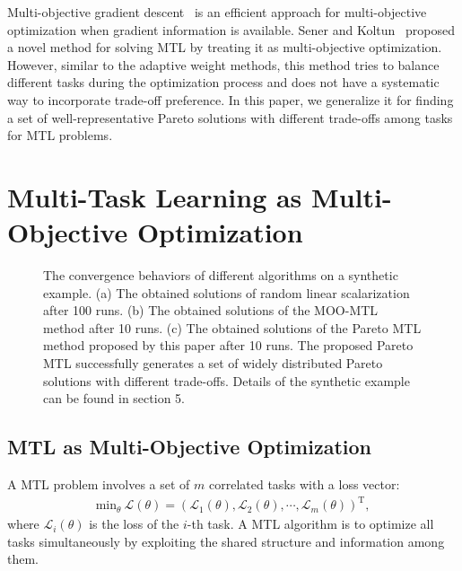 Multi-objective gradient descent~\cite{desideri2012mutiple,fliege2016method,fliege2000steepest} is an efficient approach for multi-objective optimization when gradient information is available.  Sener and Koltun~\cite{sener2018multi} proposed a novel method for solving MTL by treating it as multi-objective optimization. However, similar to the adaptive weight methods, this method tries to balance different tasks during the optimization process and does not have a systematic way to incorporate trade-off preference. In this paper, we generalize it for finding a set of well-representative Pareto solutions with different trade-offs among tasks for MTL problems.

\section{Multi-Task Learning as Multi-Objective Optimization}

\begin{figure*}[t]
\centering
{}
\caption{The convergence behaviors of different algorithms on a synthetic example. (a) The obtained solutions of random linear scalarization after 100 runs. (b) The obtained solutions of the MOO-MTL~\cite{sener2018multi} method after 10 runs. (c) The obtained solutions of the Pareto MTL method proposed by this paper after 10 runs. The proposed Pareto MTL successfully generates a set of widely distributed Pareto solutions with different trade-offs. Details of the synthetic example can be found in section 5.}
\label{PF_toy_example}
\end{figure*}

\subsection{MTL as Multi-Objective Optimization}

A MTL problem involves a set of $m$ correlated tasks with a loss vector:
\begin{align}\label{eq:mop}
\mathrm{min}_{\theta} \ \mathcal{L}(\theta) = (\mathcal{L}_1(\theta),\mathcal{L}_2(\theta),\cdots,
\mathcal{L}_m(\theta))^{\mathrm{T}},
\end{align}
where $\mathcal{L}_i(\theta)$ is the loss of the $i$-th task. A MTL algorithm is to optimize all tasks simultaneously by exploiting the shared structure and information among them.


